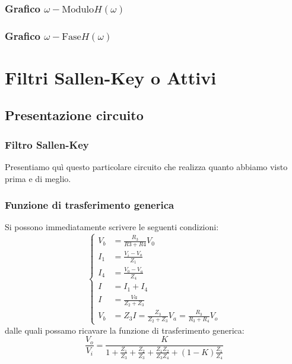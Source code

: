 		
		\begin{frame}[c]\frametitle{Grafico $\omega-\mbox{Modulo} H\left(\omega \right) $}
		
		
		\end{frame}

		\begin{frame}[c]\frametitle{Grafico $\omega-\mbox{Fase} H\left(\omega \right) $}
		
	
		
		\end{frame}
		

		\section{Filtri Sallen-Key o Attivi} %
		\label{sec:filtri_sallen_key}
		
		
			\subsection{Presentazione circuito} %
			\label{sub:presentazione_circuito}
			
			
			\begin{frame}[c]\frametitle{Filtro Sallen-Key}
			    
				Presentiamo qu\`i questo particolare circuito che realizza quanto abbiamo visto prima e di meglio.\\
				
			\end{frame}

			\begin{frame}[c]\frametitle{Funzione di trasferimento generica}
				Si possono immediatamente scrivere le seguenti condizioni:			
				\begin{equation}
				    \label{eq:equazioni}
				    \begin{cases}
				    	
				    	V_b & =\frac{R_3}{R3+R4} V_0 \\
				    	I_1 & =\frac{V_i-V_a}{Z_1} \\
				    	I_4 & =\frac{V_0-V_a}{Z_4}  \\
				    	I   & = I_1+I_4				\\
				    	I   & =\frac{Va}{Z_2+Z_3} \\ 
				    	V_b & = Z_3 I = \frac{Z_3}{Z_2+Z_3} V_a = \frac{R_3}{R_3+R_4} V_o

					\end{cases}
				\end{equation}
				dalle quali possamo ricavare la funzione di trasferimento generica:
				\begin{equation}
					\frac{V_o}{V_i}=\frac{K}{1+\frac{Z_1}{Z_3}+\frac{Z_2}{Z_3}+\frac{Z_1 Z_2}{Z_3 Z_4}+\left(1-K\right)\frac{Z_1}{Z_4}}
				\end{equation}
			\end{frame}


